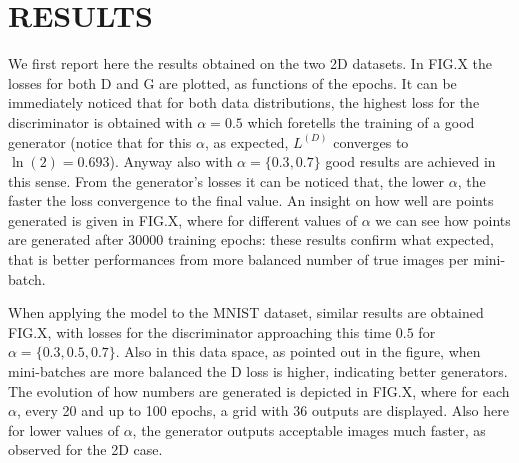 \section{RESULTS} \label{results}

We first report here the results obtained on the two 2D datasets. In FIG.X the losses for both D and G are plotted, as functions of the epochs. It can be immediately noticed that for both data distributions, the highest loss for the discriminator is obtained with $\alpha=0.5$ which foretells the training of a good generator (notice that for this $\alpha$, as expected, $L^{(D)}$ converges to $\ln(2)=0.693$). Anyway also with $\alpha=\{0.3,0.7\}$ good results are achieved in this sense. From the generator's losses it can be noticed that, the lower $\alpha$, the faster the loss convergence to the final value. An insight on how well are points generated is given in FIG.X, where for different values of $\alpha$ we can see how points are generated after 30000 training epochs: these results confirm what expected, that is better performances from more balanced number of true images per mini-batch.

When applying the model to the MNIST dataset, similar results are obtained FIG.X, with losses for the discriminator approaching this time $0.5$ for $\alpha=\{0.3,0.5,0.7\}$. Also in this data space, as pointed out in the figure, when mini-batches are more balanced the D loss is higher, indicating better generators.
The evolution of how numbers are generated is depicted in FIG.X, where for each $\alpha$, every 20 and up to 100 epochs, a grid with 36 outputs are displayed. Also here for lower values of $\alpha$, the generator outputs acceptable images much faster, as observed for the 2D case.